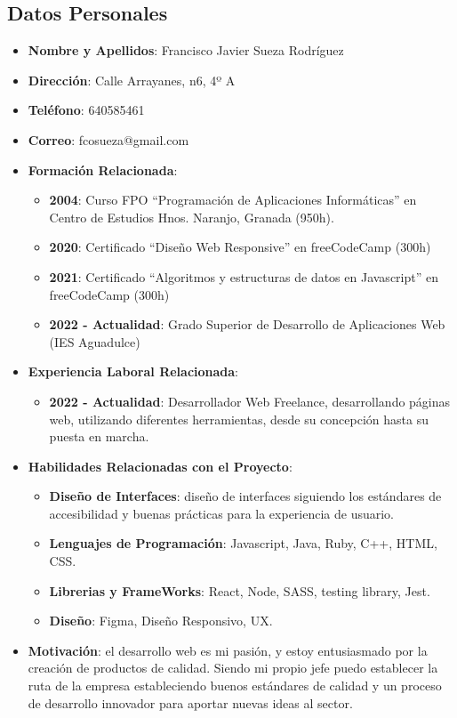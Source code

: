\subsection{Datos Personales}

\begin{itemize}
    \item \textbf{Nombre y Apellidos}: Francisco Javier Sueza Rodríguez
    \item \textbf{Dirección}: Calle Arrayanes, n6, 4º A
    \item \textbf{Teléfono}: 640585461
    \item \textbf{Correo}: fcosueza@gmail.com
    \item \textbf{Formación Relacionada}:
    \begin{itemize}
        \item \textbf{2004}: Curso FPO “Programación de Aplicaciones Informáticas” en Centro de Estudios Hnos.
        Naranjo, Granada (950h).
        \item \textbf{2020}: Certificado “Diseño Web Responsive” en freeCodeCamp (300h)
        \item \textbf{2021}: Certificado “Algoritmos y estructuras de datos en Javascript” en freeCodeCamp (300h)
        \item \textbf{2022 - Actualidad}: Grado Superior de Desarrollo de Aplicaciones Web (IES Aguadulce)
    \end{itemize}
    \item \textbf{Experiencia Laboral Relacionada}:
    \begin{itemize}
        \item \textbf{2022 - Actualidad}: Desarrollador Web Freelance, desarrollando páginas web, utilizando diferentes herramientas, desde su concepción hasta su puesta en marcha.
    \end{itemize}
    \item \textbf{Habilidades Relacionadas con el Proyecto}:
    \begin{itemize}
        \item \textbf{Diseño de Interfaces}: diseño de interfaces siguiendo los estándares de accesibilidad y buenas prácticas para la experiencia de usuario.
        \item \textbf{Lenguajes de Programación}: Javascript, Java, Ruby, C++, HTML, CSS.
        \item \textbf{Librerias y FrameWorks}: React, Node, SASS, testing library, Jest.
        \item \textbf{Diseño}: Figma, Diseño Responsivo, UX.
    \end{itemize}
    \item \textbf{Motivación}: el desarrollo web es mi pasión, y estoy entusiasmado por la creación de productos de calidad. Siendo mi propio jefe puedo establecer la ruta de la empresa estableciendo buenos estándares de calidad y un proceso de desarrollo innovador para aportar nuevas ideas al sector.
\end{itemize}

